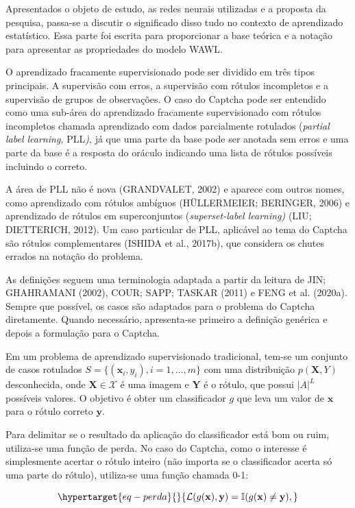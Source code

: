 \documentclass[12pt,twoside,brazilian]{book}
\begin{document}
Apresentados o objeto de estudo, as redes neurais utilizadas e a
proposta da pesquisa, passa-se a discutir o significado disso tudo no
contexto de aprendizado estatístico. Essa parte foi escrita para
proporcionar a base teórica e a notação para apresentar as propriedades
do modelo WAWL.

O aprendizado fracamente supervisionado pode ser dividido em três tipos
principais. A supervisão com erros, a supervisão com rótulos incompletos
e a supervisão de grupos de observações. O caso do Captcha pode ser
entendido como uma sub-área do aprendizado fracamente supervisionado com
rótulos incompletos chamada aprendizado com dados parcialmente rotulados
(\emph{partial label learning,} PLL\emph{)}, já que uma parte da base
pode ser anotada sem erros e uma parte da base é a resposta do oráculo
indicando uma lista de rótulos possíveis incluindo o correto.

A área de PLL não é nova (GRANDVALET, 2002) e aparece com outros nomes,
como aprendizado com rótulos ambíguos (HÜLLERMEIER; BERINGER, 2006) e
aprendizado de rótulos em superconjuntos (\emph{superset-label
learning)} (LIU; DIETTERICH, 2012). Um caso particular de PLL, aplicável
ao tema do Captcha são rótulos complementares (ISHIDA et al., 2017b),
que considera os chutes errados na notação do problema.

As definições seguem uma terminologia adaptada a partir da leitura de
JIN; GHAHRAMANI (2002), COUR; SAPP; TASKAR (2011) e FENG et al. (2020a).
Sempre que possível, os casos são adaptados para o problema do Captcha
diretamente. Quando necessário, apresenta-se primeiro a definição
genérica e depois a formulação para o Captcha.

Em um problema de aprendizado supervisionado tradicional, tem-se um
conjunto de casos rotulados \(S=\{(\mathbf x_i,y_i), i=1,\dots, m\}\)
com uma distribuição \(p(\mathbf X,Y)\) desconhecida, onde
\(\mathbf X\in \mathcal X\) é uma imagem e \(\mathbf Y\) é o rótulo, que
possui \(|A|^L\) possíveis valores. O objetivo é obter um classificador
\(g\) que leva um valor de \(\mathbf x\) para o rótulo correto
\(\mathbf y\).

Para delimitar se o resultado da aplicação do classificador está bom ou
ruim, utiliza-se uma função de perda. No caso do Captcha, como o
interesse é simplesmente acertar o rótulo inteiro (não importa se o
classificador acerta só uma parte do rótulo), utiliza-se uma função
chamada 0-1:

\begin{equation}\protect\hypertarget{eq-perda}{}{
\mathcal L(g(\mathbf x),\mathbf y) = \mathbb I (g(\mathbf x) \neq \mathbf y),
}\label{eq-perda}\end{equation}
\end{document}
